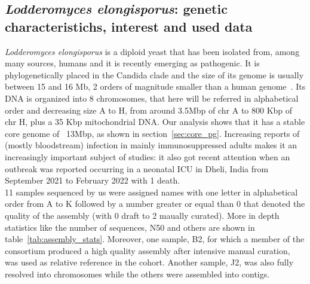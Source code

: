 \subsection{\emph{Lodderomyces elongisporus}: genetic characteristichs, interest and used data}
\emph{Lodderomyces elongisporus} is a diploid yeast that has been isolated from, among many sources, humans and it is recently emerging as pathogenic. It is phylogenetically placed in the Candida clade and the size of its genome is usually between 15 and 16 Mb, 2 orders of magnitude smaller than a human genome~\cite{Lodderomyces}. Its DNA is organized into 8 chromosomes, that here will be referred in alphabetical order and decreasing size A to H, from around 3.5Mbp of chr A to 800 Kbp of chr H, plus a 35 Kbp mitochondrial DNA. Our analysis shows that it has a stable core genome of ~13Mbp, as shown in section~\ref{sec:core_pg}. 
Increasing reports of (mostly bloodstream) infection in mainly immunosuppressed adults makes it an increasingly important subject of studies\cite{lodelo_pathogen,lodelo_fatal,lodelo_meningitis,lodelo_bloodstream}: it also got recent attention when an outbreak was reported occurring in a neonatal ICU in Dheli, India from September 2021 to February 2022 with 1 death\cite{lodelo_india}.\\
11 samples sequenced by us were assigned names with one letter in alphabetical order from A to K followed by a number greater or equal than 0 that denoted the quality of the assembly (with 0 draft to 2 maually curated). More in depth statistics like the number of sequences, N50 and others are shown in table~\ref{tab:assembly_stats}. Moreover, one sample, B2, for which a member of the consortium produced a high quality assembly after intensive manual curation, was used as relative reference in the cohort. Another sample, J2, was also fully resolved into chromosomes while the others were assembled into contigs.

